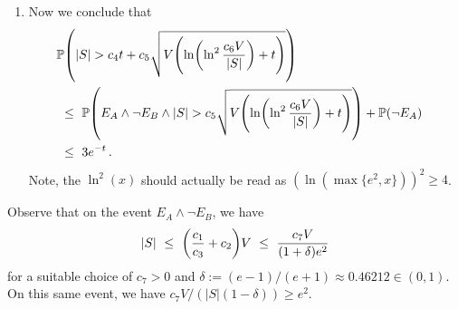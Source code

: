 \documentclass[11pt]{article}
\renewcommand{\P}{\ensuremath{\mathbb{P}}}
\theoremstyle{remark}
\theoremstyle{definition}
\newcommand\braces[1]{\{#1\}}
\newcommand\Parens[1]{\mleft(#1\mright)}
\begin{document}
\begin{enumerate}
  \item
    Now we conclude that
    \begin{align*}
      \lefteqn{
        \P\Parens{
          |S| >
          c_4 t +
          c_5 \sqrt{
            V \Parens{
              \ln\Parens{
                \ln^2\frac{c_6V}{|S|}
              } + t
            }
          }
        }
      } \\
      & \ \leq \
      \P\Parens{
        E_A \wedge
        \neg E_B \wedge
        |S| >
        c_5 \sqrt{
          V \Parens{
            \ln\Parens{
              \ln^2\frac{c_6V}{|S|}
            } + t
          }
        }
      }
      + \P(\neg E_A)
      \\
      & \ \leq \
      3e^{-t}
      \,.
    \end{align*}
    Note, the $\ln^2(x)$ should actually be read as
    $(\ln(\max\braces{e^2,x}))^2 \geq 4$.

\end{enumerate}

Observe that on the event $E_A \wedge \neg E_B$, we have
\[
  |S|
  \ \leq \
  \Parens{
    \frac{c_1}{c_3} + c_2
  } V
  \ \leq \
  \frac{c_7V}{(1+\delta)e^2}
\]
for a suitable choice of $c_7>0$ and $\delta := (e-1)/(e+1) \approx
0.46212 \in (0,1)$.
On this same event, we have $c_7V/(|S|(1-\delta)) \geq e^2$.
\end{document}
